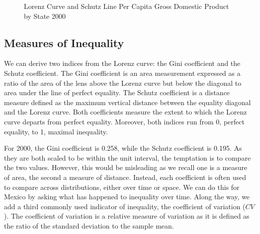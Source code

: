 \documentclass[
  a4paper, 
  twoside,
  final
]{article}
\begin{document}
\begin{figure}[H]


\caption{\label{fig-schutz2000}Lorenz Curve and Schutz Line Per Capita
Gross Domestic Product by State 2000}

\end{figure}%

\subsection{Measures of Inequality}\label{measures-of-inequality}

We can derive two indices from the Lorenz curve: the Gini coefficient
and the Schutz coefficient. The Gini coefficient is an area measurement
expressed as a ratio of the area of the lens above the Lorenz curve but
below the diagonal to area under the line of perfect equality. The
Schutz coefficient is a distance measure defined as the maximum vertical
distance between the equality diagonal and the Lorenz curve. Both
coefficients measure the extent to which the Lorenz curve departs from
perfect equality. Moreover, both indices run from 0, perfect equality,
to 1, maximal inequality.

For 2000, the Gini coefficient is 0.258, while the Schutz coefficient is
0.195. As they are both scaled to be within the unit interval, the
temptation is to compare the two values. However, this would be
misleading as we recall one is a measure of area, the second a measure
of distance. Instead, each coefficient is often used to compare across
distributions, either over time or space. We can do this for Mexico by
asking what has happened to inequality over time. Along the way, we add
a third commonly used indicator of inequality, the coefficient of
variation (\(CV\)). The coefficient of variation is a relative measure
of variation as it is defined as the ratio of the standard deviation to
the sample mean.
\end{document}
